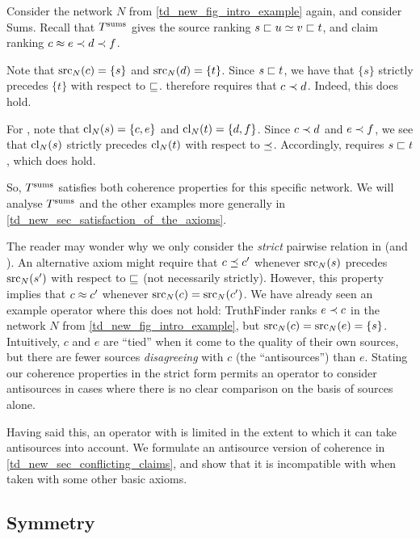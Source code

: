 \begin{example}
    \label{td_new_ex_coherence_ilustration}
    Consider the network $N$ from \cref{td_new_fig_intro_example} again, and
    consider Sums. Recall that $T^{\operatorname{sums}}$ gives the source ranking $s \sqsubset u \simeq
    v \sqsubset t$, and claim ranking $c \approx e \prec d \prec f$.

    Note that $\operatorname{src}_N(c) = \{s\}$ and $\operatorname{src}_N(d) = \{t\}$. Since $s \sqsubset t$, we
    have that $\{s\}$ strictly precedes $\{t\}$ with respect to $\sqsubseteq$.
    \claimcoherence{} therefore requires that $c \prec d$. Indeed, this does
    hold.

    For \sourcecoherence{}, note that $\operatorname{cl}_N(s) = \{c, e\}$ and
    $\operatorname{cl}_N(t) = \{d, f\}$. Since $c \prec d$ and $e \prec f$, we see that
    $\operatorname{cl}_N(s)$ strictly precedes $\operatorname{cl}_N(t)$ with respect to $\preceq$.
    Accordingly, \sourcecoherence{} requires $s \sqsubset t$, which does hold.

    So, $T^{\operatorname{sums}}$ satisfies both coherence properties for this specific network.
    We will analyse $T^{\operatorname{sums}}$ and the other examples more generally in
    \cref{td_new_sec_satisfaction_of_the_axioms}.
\end{example}

The reader may wonder why we only consider the \emph{strict} pairwise relation
in \claimcoherence{} (and \sourcecoherence{}). An alternative axiom might
require that $c \preceq c'$ whenever $\operatorname{src}_N(s)$ precedes $\operatorname{src}_N(s')$ with
respect to $\sqsubseteq$ (not necessarily strictly). However, this property implies
that $c \approx c'$ whenever $\operatorname{src}_N(c) = \operatorname{src}_N(c')$. We have already seen an
example operator where this does not hold: TruthFinder ranks $e \prec c$ in the
network $N$ from \cref{td_new_fig_intro_example}, but $\operatorname{src}_N(c) = \operatorname{src}_N(e) =
\{s\}$. Intuitively, $c$ and $e$ are ``tied'' when it come to the quality of
their own sources, but there are fewer sources \emph{disagreeing} with $c$ (the
``antisources'') than $e$. Stating our coherence properties in the strict form
permits an operator to consider antisources in cases where there is no clear
comparison on the basis of sources alone.

Having said this, an operator with \claimcoherence{} is limited in the extent
to which it can take antisources into account. We formulate an antisource
version of coherence in \cref{td_new_sec_conflicting_claims}, and show that
it is incompatible with \claimcoherence{} when taken with some other basic
axioms.

\subsection{Symmetry}

